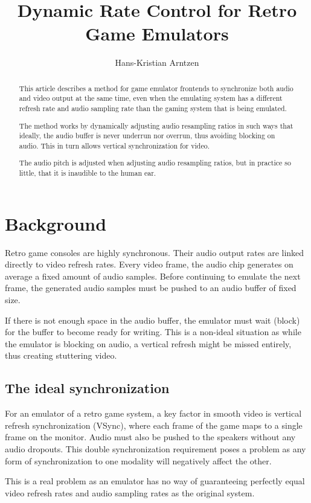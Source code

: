 \documentclass[11pt, a4paper]{article}
\title{Dynamic Rate Control for Retro Game Emulators}
\author{Hans-Kristian Arntzen}
\begin{document}
\maketitle

\begin{abstract}
This article describes a method for game emulator frontends
to synchronize both audio and video output at the same time, even
when the emulating system has a different refresh rate and audio sampling rate
than the gaming system that is being emulated.

The method works by dynamically adjusting audio resampling ratios in such ways that
ideally, the audio buffer is never underrun nor overrun, thus avoiding blocking on audio.
This in turn allows vertical synchronization for video.

The audio pitch is adjusted when adjusting audio resampling ratios,
but in practice so little, that it is inaudible to the human ear.
\end{abstract}

\section{Background}

Retro game consoles are highly synchronous. Their audio output rates are linked directly
to video refresh rates. Every video frame, the audio chip generates on average a fixed amount of audio samples. Before continuing to emulate the next frame, the generated audio samples must be pushed
to an audio buffer of fixed size.

If there is not enough space in the audio buffer, the emulator must wait (block) for the buffer to become ready for writing. This is a non-ideal situation as while the emulator is blocking on audio, a vertical refresh might be missed entirely, thus creating stuttering video.

\subsection{The ideal synchronization}
For an emulator of a retro game system, a key factor in smooth video is vertical refresh synchronization (VSync), where each frame of the game maps to a single frame on the monitor.
Audio must also be pushed to the speakers without any audio dropouts.
This double synchronization requirement poses a problem as any form of synchronization to one modality
will negatively affect the other.

This is a real problem as an emulator has no way of guaranteeing perfectly equal
video refresh rates and audio sampling rates as the original system.
\end{document}
